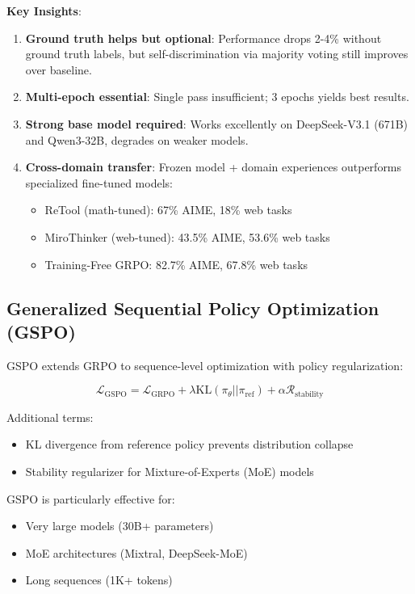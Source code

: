 \documentclass[11pt,letterpaper]{article}
\begin{document}
\textbf{Key Insights}:
\begin{enumerate}
\item \textbf{Ground truth helps but optional}: Performance drops 2-4\% without ground truth labels, but self-discrimination via majority voting still improves over baseline.
\item \textbf{Multi-epoch essential}: Single pass insufficient; 3 epochs yields best results.
\item \textbf{Strong base model required}: Works excellently on DeepSeek-V3.1 (671B) and Qwen3-32B, degrades on weaker models.
\item \textbf{Cross-domain transfer}: Frozen model + domain experiences outperforms specialized fine-tuned models:
   \begin{itemize}
   \item ReTool (math-tuned): 67\% AIME, 18\% web tasks
   \item MiroThinker (web-tuned): 43.5\% AIME, 53.6\% web tasks
   \item Training-Free GRPO: 82.7\% AIME, 67.8\% web tasks
   \end{itemize}
\end{enumerate}

\subsection{Generalized Sequential Policy Optimization (GSPO)}

GSPO extends GRPO to sequence-level optimization with policy regularization:

\begin{equation}
\mathcal{L}_{\text{GSPO}} = \mathcal{L}_{\text{GRPO}} + \lambda \text{KL}(\pi_\theta || \pi_{\text{ref}}) + \alpha \mathcal{R}_{\text{stability}}
\end{equation}

Additional terms:
\begin{itemize}
\item KL divergence from reference policy prevents distribution collapse
\item Stability regularizer for Mixture-of-Experts (MoE) models
\end{itemize}

GSPO is particularly effective for:
\begin{itemize}
\item Very large models (30B+ parameters)
\item MoE architectures (Mixtral, DeepSeek-MoE)
\item Long sequences (1K+ tokens)
\end{itemize}
\end{document}
